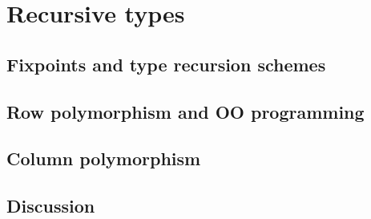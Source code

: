
\chapter{Recursive types}

\section{Fixpoints and type recursion schemes}

\section{Row polymorphism and OO programming}

\section{Column polymorphism}

\section{Discussion}

\begin{comment}
\end{comment}


